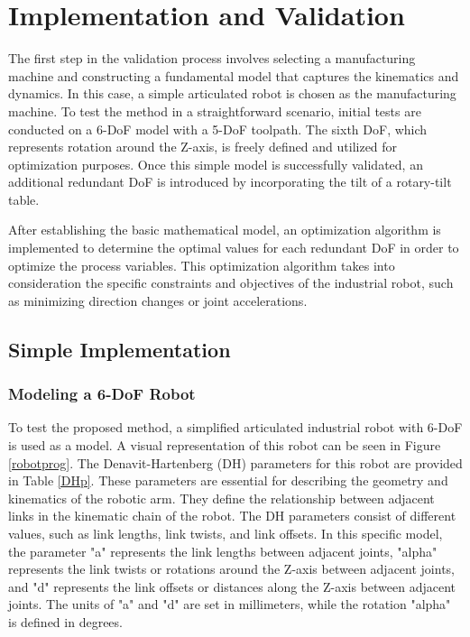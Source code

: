 \chapter{Implementation and Validation}%

The first step in the validation process involves selecting a manufacturing machine and constructing a fundamental model that captures the kinematics and dynamics. In this case, a simple articulated robot is chosen as the manufacturing machine. To test the method in a straightforward scenario, initial tests are conducted on a 6-\acrshort{DoF} model with a 5-\acrshort{DoF} toolpath. The sixth \acrshort{DoF}, which represents rotation around the Z-axis, is freely defined and utilized for optimization purposes. Once this simple model is successfully validated, an additional redundant \acrshort{DoF} is introduced by incorporating the tilt of a rotary-tilt table.

After establishing the basic mathematical model, an optimization algorithm is implemented to determine the optimal values for each redundant \acrshort{DoF} in order to optimize the process variables. This optimization algorithm takes into consideration the specific constraints and objectives of the industrial robot, such as minimizing direction changes or joint accelerations.



\section{Simple Implementation}%
\subsection{Modeling a 6-DoF Robot}
To test the proposed method, a simplified articulated industrial robot with 6-\acrshort{DoF} is used as a model. A visual representation of this robot can be seen in Figure \ref{robotprog}. The Denavit-Hartenberg (\acrshort{DH}) parameters for this robot are provided in Table \ref{DHp}. These parameters are essential for describing the geometry and kinematics of the robotic arm. They define the relationship between adjacent links in the kinematic chain of the robot.
The DH parameters consist of different values, such as link lengths, link twists, and link offsets. In this specific model, the parameter "a" represents the link lengths between adjacent joints, "alpha" represents the link twists or rotations around the Z-axis between adjacent joints, and "d" represents the link offsets or distances along the Z-axis between adjacent joints. The units of "a" and "d" are set in millimeters, while the rotation "alpha" is defined in degrees.

